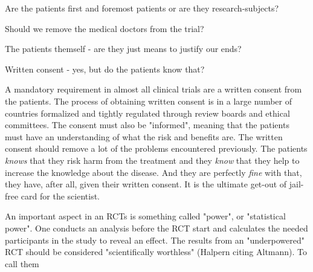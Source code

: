 \documentclass[12p]{article}
\begin{document}
Are the patients first and foremost patients or are they research-subjects?

Should we remove the medical doctors from the trial?

The patients themself - are they just means to justify our ends?

Written consent - yes, but do the patients know that?

A mandatory requirement in almost all clinical trials are a written consent from the patients.
The process of obtaining written consent is in a large number of countries formalized and tightly regulated through review boards and ethical committees.
The consent must also be "informed", meaning that the patients must have an understanding of what the risk and benefits are.
The written consent should remove a lot of the problems encountered previously.
The patients \emph{knows} that they risk harm from the treatment and they \emph{know} that they help to increase the knowledge about the disease.
And they are perfectly \emph{fine} with that, they have, after all, given their written consent. 
It is the ultimate get-out of jail-free card for the scientist.




An important aspect in an RCTs is something called "power", or "statistical power".
One conducts an analysis before the RCT start and calculates the needed participants in the study to reveal an effect.
The results from an "underpowered" RCT should be considered "scientifically worthless" (Halpern citing Altmann). 
To call them 
 

\end{document}
